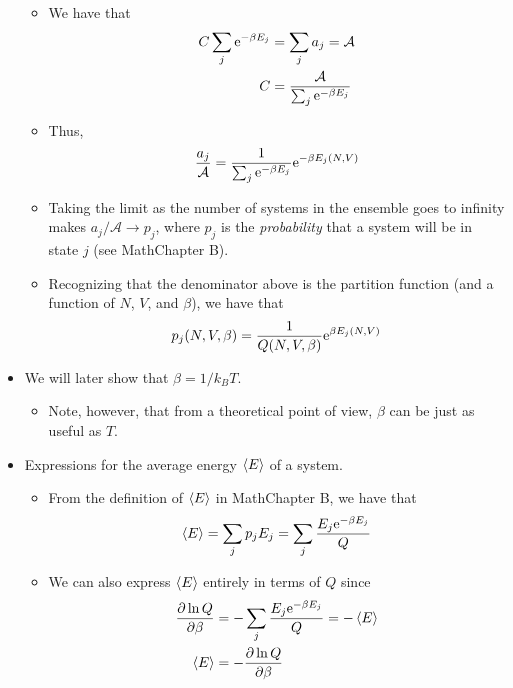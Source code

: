 \documentclass[../notes.tex]{subfiles}
\begin{document}
\begin{itemize}
    \begin{itemize}
        \item We have that
        \begin{align*}
            C\sum_j\e[-\beta E_j] &= \sum_ja_j = \mathcal{A}\\
            C &= \frac{\mathcal{A}}{\sum_j\e[-\beta E_j]}
        \end{align*}
        \item Thus,
        \begin{equation*}
            \frac{a_j}{\mathcal{A}} = \frac{1}{\sum_j\e[-\beta E_j]}\e[-\beta E_j(N,V)]
        \end{equation*}
        \item Taking the limit as the number of systems in the ensemble goes to infinity makes $a_j/\mathcal{A}\to p_j$, where $p_j$ is the \emph{probability} that a system will be in state $j$ (see MathChapter B).
        \item Recognizing that the denominator above is the partition function (and a function of $N$, $V$, and $\beta$), we have that
        \begin{equation*}
            p_j(N,V,\beta) = \frac{1}{Q(N,V,\beta)}\e[\beta E_j(N,V)]
        \end{equation*}
    \end{itemize}
    \item We will later show that $\beta=1/k_BT$.
    \begin{itemize}
        \item Note, however, that from a theoretical point of view, $\beta$ can be just as useful as $T$.
    \end{itemize}
    \item Expressions for the average energy $\prb{E}$ of a system.
    \begin{itemize}
        \item From the definition of $\prb{E}$ in MathChapter B, we have that
        \begin{equation*}
            \prb{E} = \sum_j p_jE_j = \sum_j\frac{E_j\e[-\beta E_j]}{Q}
        \end{equation*}
        \item We can also express $\prb{E}$ entirely in terms of $Q$ since
        \begin{align*}
            \pdv{\ln Q}{\beta} &= -\sum_j\frac{E_j\e[-\beta E_j]}{Q} = -\prb{E}\\
            \prb{E} &= -\pdv{\ln Q}{\beta}
        \end{align*}

\end{itemize}
\end{itemize}
\end{document}
